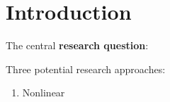 \section{Introduction}\label{sec1:Introduction}
The central \textbf{research question}:
 
 
Three potential research approaches:
\begin{enumerate}
    \item Nonlinear  
\end{enumerate}